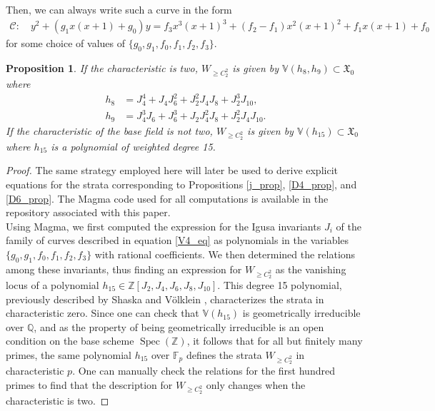 \documentclass{amsart}
\newcommand{\calC}{\mathcal{C}}
\DeclareMathOperator{\Spec}{Spec}
\numberwithin{equation}{section}
\newtheorem{proposition}[theorem]{Proposition}
\theoremstyle{definition}
\theoremstyle{remark}
\begin{document}
Then, we can always write such a curve in the form
\begin{align} \label{V4_eq}
\calC\colon\quad y^2+(g_1x(x+1)+g_0)y=f_3 x^3(x+1)^3+(f_2-f_1)x^2(x+1)^2+f_1x(x+1)+f_0
\end{align}
for some choice of values of $\{g_0,g_1,f_0,f_1,f_2,f_3\}$.\\

\begin{proposition} \label{strat_prop}
If the characteristic is two, $W_{\geq C_2^2}$ is given by $\mathbb{V}(h_{8},h_{9})\subset\mathfrak{X}_0$ where
\begin{align*}
h_8&=J_4^4 + J_4J_6^2 + J_2^2J_4J_8 + J_2^3J_{10},\\
h_9&=J_4^3J_6 + J_6^3 + J_2J_4^2J_8 + J_2^2J_4J_{10}.
\end{align*}
If the characteristic of the base field is not two, $W_{\geq C_2^2}$ is given by $\mathbb{V}(h_{15})\subset\mathfrak{X}_0$ where $h_{15}$ is a polynomial of weighted degree 15.\\
\end{proposition}
\begin{proof}
The same strategy employed here will later be used to derive explicit equations for the strata corresponding to Propositions \ref{j_prop}, \ref{D4_prop}, and \ref{D6_prop}. The Magma code used for all computations is available in the repository associated with this paper.\\

Using Magma, we first computed the expression for the Igusa invariants $J_i$ of the family of curves described in equation \ref{V4_eq} as polynomials in the variables $\{g_0,g_1,f_0,f_1,f_2,f_3\}$ with rational coefficients. We then determined the relations among these invariants, thus finding an expression for $W_{\geq C_2^2}$ as the vanishing locus of a polynomial $h_{15}\in\mathbb{Z}[J_2,J_4,J_6,J_8,J_{10}]$. This degree 15 polynomial, previously described by Shaska and Völklein \cite{Shaska2004EllipticFields}, characterizes the strata in characteristic zero. Since one can check that $\mathbb{V}(h_{15})$ is geometrically irreducible over $\mathbb{Q}$, and as the property of being geometrically irreducible is an open condition on the base scheme $\Spec(\mathbb{Z})$, it follows that for all but finitely many primes, the same polynomial $h_{15}$ over $\mathbb{F}_p$ defines the strata $W_{\geq C_2^2}$ in characteristic $p$. One can manually check the relations for the first hundred primes to find that the description for $W_{\geq C_2^2}$ only changes when the characteristic is two. 
\end{proof}\vspace{10pt}
\end{document}
